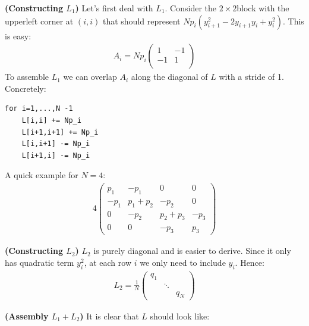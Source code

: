 \textbf{(Constructing $L_1$)}
Let's first deal with $L_1$. Consider the $2\times 2$block with the upperleft corner at $(i,i)$ that should
represent $Np_i(y_{i+1}^2 -2y_{i+1}y_i +y_i^2)$. This is easy:
\begin{equation}
\begin{aligned}
A_i=Np_i\begin{pmatrix}
1 & -1\\
-1 & 1 \\
\end{pmatrix}
\end{aligned}
\end{equation}
To assemble $L_1$ we can overlap $A_i$ along the diagonal of $L$ with a stride of 1. Concretely:

\begin{verbatim}
for i=1,...,N -1
    L[i,i] += Np_i
    L[i+1,i+1] += Np_i
    L[i,i+1] -= Np_i 
    L[i+1,i] -= Np_i
\end{verbatim}

\begin{example}A quick example for $N=4$:
\begin{equation}
\begin{aligned}
4\begin{pmatrix}
p_1 & -p_1 & 0 & 0 \\
-p_1 & p_1+p_2 & -p_2 &0 \\
0 & -p_2 & p_2+p_3 & -p_3 \\
0 &  0 & -p_3  & p_3
\end{pmatrix}
\end{aligned}
\end{equation}

\end{example}\textbf{(Constructing $L_2$)}
$L_2$ is purely diagonal and is easier to derive. Since it only has quadratic term $y_i^2$, at each row $i$ we only need to include $y_i$. Hence:
\begin{equation}
\begin{aligned}
L_2 = \frac{1}{N}\begin{pmatrix}q_1 & & \\
& \ddots & \\
& & q_N
\end{pmatrix}
\end{aligned}
\end{equation}

\textbf{(Assembly $L_1+L_2$)}
It is clear that $L$ should look like:

